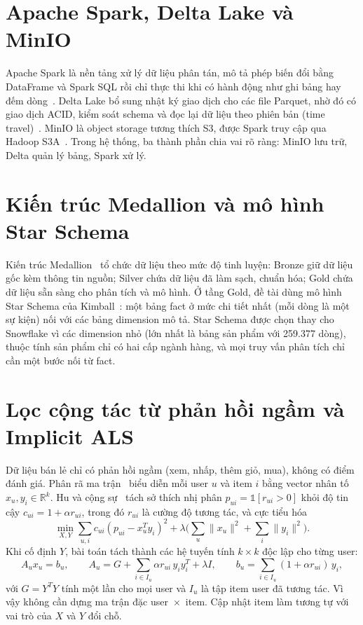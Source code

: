 \documentclass[a4paper,12pt,oneside]{report}
\begin{document}
\section{Apache Spark, Delta Lake và MinIO}
Apache Spark là nền tảng xử lý dữ liệu phân tán, mô tả phép biến đổi bằng DataFrame và Spark SQL rồi chỉ thực thi khi có hành động như ghi bảng hay đếm dòng~\cite{spark,sparksql}. Delta Lake bổ sung nhật ký giao dịch cho các file Parquet, nhờ đó có giao dịch ACID, kiểm soát schema và đọc lại dữ liệu theo phiên bản (time travel)~\cite{delta,deltadocs}. MinIO là object storage tương thích S3, được Spark truy cập qua Hadoop S3A~\cite{s3a}. Trong hệ thống, ba thành phần chia vai rõ ràng: MinIO lưu trữ, Delta quản lý bảng, Spark xử lý.

\section{Kiến trúc Medallion và mô hình Star Schema}
Kiến trúc Medallion~\cite{medallion} tổ chức dữ liệu theo mức độ tinh luyện: Bronze giữ dữ liệu gốc kèm thông tin nguồn; Silver chứa dữ liệu đã làm sạch, chuẩn hóa; Gold chứa dữ liệu sẵn sàng cho phân tích và mô hình. Ở tầng Gold, đề tài dùng mô hình Star Schema của Kimball~\cite{kimball}: một bảng fact ở mức chi tiết nhất (mỗi dòng là một sự kiện) nối với các bảng dimension mô tả. Star Schema được chọn thay cho Snowflake vì các dimension nhỏ (lớn nhất là bảng sản phẩm với 259.377 dòng), thuộc tính sản phẩm chỉ có hai cấp ngành hàng, và mọi truy vấn phân tích chỉ cần một bước nối từ fact.

\section{Lọc cộng tác từ phản hồi ngầm và Implicit ALS}
Dữ liệu bán lẻ chỉ có phản hồi ngầm (xem, nhấp, thêm giỏ, mua), không có điểm đánh giá. Phân rã ma trận~\cite{koren} biểu diễn mỗi user $u$ và item $i$ bằng vector nhân tố $x_u, y_i \in \mathbb{R}^k$. Hu và cộng sự~\cite{hu} tách sở thích nhị phân $p_{ui}=\mathds{1}[r_{ui}>0]$ khỏi độ tin cậy $c_{ui}=1+\alpha r_{ui}$, trong đó $r_{ui}$ là cường độ tương tác, và cực tiểu hóa
\begin{equation}
\min_{X,Y}\sum_{u,i}c_{ui}\left(p_{ui}-x_u^{T}y_i\right)^2+\lambda\Big(\sum_u\|x_u\|^2+\sum_i\|y_i\|^2\Big).
\end{equation}
Khi cố định $Y$, bài toán tách thành các hệ tuyến tính $k\times k$ độc lập cho từng user:
\begin{equation}
A_u x_u=b_u,\qquad A_u=G+\sum_{i\in I_u}\alpha r_{ui}\,y_iy_i^{T}+\lambda I,\qquad b_u=\sum_{i\in I_u}(1+\alpha r_{ui})\,y_i,
\end{equation}
với $G=Y^{T}Y$ tính một lần cho mọi user và $I_u$ là tập item user đã tương tác. Vì vậy không cần dựng ma trận đặc user~$\times$~item. Cập nhật item làm tương tự với vai trò của $X$ và $Y$ đổi chỗ.
\end{document}

